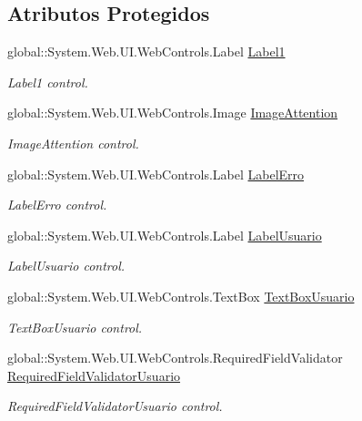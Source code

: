 \subsection*{Atributos Protegidos}
\begin{DoxyCompactItemize}
\item 
global::System.Web.UI.WebControls.Label \hyperlink{class_sistema_r_h_1_1_web_form1_add2edc3a2b9b5b6be19e4b3af2458211}{Label1}
\begin{DoxyCompactList}\small\item\em Label1 control. \item\end{DoxyCompactList}\item 
global::System.Web.UI.WebControls.Image \hyperlink{class_sistema_r_h_1_1_web_form1_a07003e3d30b663797ab5e01f2154627c}{ImageAttention}
\begin{DoxyCompactList}\small\item\em ImageAttention control. \item\end{DoxyCompactList}\item 
global::System.Web.UI.WebControls.Label \hyperlink{class_sistema_r_h_1_1_web_form1_a1e886dd55344d877d73ac0022d7b5f44}{LabelErro}
\begin{DoxyCompactList}\small\item\em LabelErro control. \item\end{DoxyCompactList}\item 
global::System.Web.UI.WebControls.Label \hyperlink{class_sistema_r_h_1_1_web_form1_a27359ed50632d923f2355acf79d847fc}{LabelUsuario}
\begin{DoxyCompactList}\small\item\em LabelUsuario control. \item\end{DoxyCompactList}\item 
global::System.Web.UI.WebControls.TextBox \hyperlink{class_sistema_r_h_1_1_web_form1_a05fab8e61d8314061c68581aaa22ff27}{TextBoxUsuario}
\begin{DoxyCompactList}\small\item\em TextBoxUsuario control. \item\end{DoxyCompactList}\item 
global::System.Web.UI.WebControls.RequiredFieldValidator \hyperlink{class_sistema_r_h_1_1_web_form1_aefe621ace948bf25f184de6cf7c01363}{RequiredFieldValidatorUsuario}
\begin{DoxyCompactList}\small\item\em RequiredFieldValidatorUsuario control. \item\end{DoxyCompactList}\item 

\end{DoxyCompactItemize}
